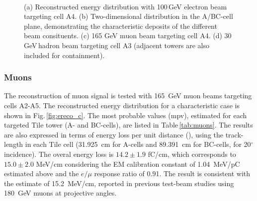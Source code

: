 \begin{figure}[t]
  \centering
  \\
  \caption{(a) Reconstructed energy distribution with 100\,GeV electron beam targeting cell A4. (b) Two-dimensional distribution
  in the A/BC-cell plane, demonstrating the characteristic deposits of the different beam consituents. (c) 165 GeV muon beam 
  targeting cell A4. (d) 30 GeV\,hadron beam targeting cell A3 (adjacent towers are also included for containment).\label{fig:ereco}}
\end{figure}

\subsubsection*{Muons}

The reconstruction of muon signal is tested with \SI{165}{GeV} muon beams targeting cells A2-A5. The reconstructed energy distribution
for a characteristic case is shown in Fig.\,\ref{fig:ereco_c}. The most probable values (mpv), estimated for each targeted Tile tower 
(A- and BC-cells), are listed in Table\,\ref{tab:muons}. The results are also expressed in terms of energy loss per unit distance (\dedx), 
using the track-length in each Tile cell (\SI{31.925}{cm} for A-cells and \SI{89.391}{cm} for BC-cells, for 20$^\circ$ incidence). The 
overal energy loss is $14.2\pm 1.9$ \si{fC/cm}, which corresponds to $15.0\pm 2.0$ \si{MeV/cm} considering the EM calibration 
constant of \SI{1.04}{MeV/pC} estimated above and the $e/\mu$ response ratio of 0.91. The result is consistent with the estimate of
\SI{15.2}{MeV/cm}, reported in previous test-beam studies using \SI{180}{GeV} muons at projective angles.

